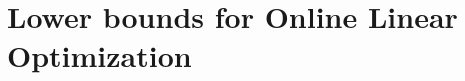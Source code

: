 \documentclass[../main]{subfiles}
\begin{document}
\setcounter{chapter}{4}

\chapter{Lower bounds for Online Linear Optimization}




\end{document}
